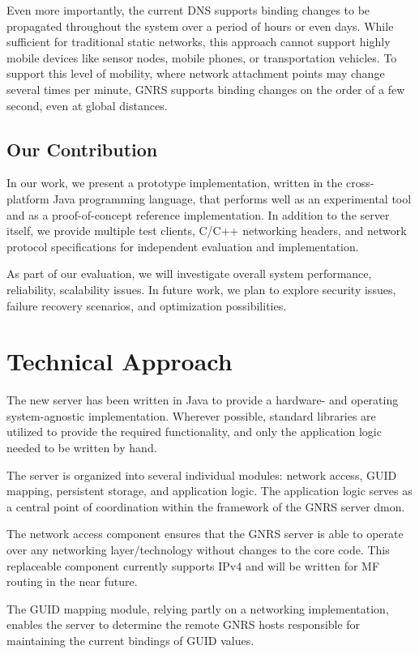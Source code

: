 \documentclass{article}
\begin{document}
Even more importantly, the current DNS supports binding changes to be
propagated throughout the system over a period of hours or even days.  While
sufficient for traditional static networks, this approach cannot support
highly mobile devices like sensor nodes, mobile phones, or transportation
vehicles.  To support this level of mobility, where network attachment points
may change several times per minute, GNRS supports binding changes on the
order of a few second, even at global distances.

\subsection{Our Contribution}
In our work, we present a prototype implementation, written in the
cross-platform Java programming language, that performs well as an
experimental tool and as a proof-of-concept reference implementation.  In
addition to the server itself, we provide multiple test clients, C/C++
networking headers, and network protocol specifications for independent
evaluation and implementation.

As part of our evaluation, we will investigate overall system performance,
reliability, scalability issues.  In future work, we plan to explore security
issues, failure recovery scenarios, and optimization possibilities.

\section{Technical Approach}
The new server has been written in Java to provide a hardware- and operating
system-agnostic implementation.  Wherever possible, standard libraries are
utilized to provide the required functionality, and only the application logic
needed to be written by hand.

The server is organized into several individual modules: network access, GUID
mapping, persistent storage, and application logic.  The application logic
serves as a central point of coordination within the framework of the GNRS
server dmon.

The network access component ensures that the GNRS server is able to operate
over any networking layer/technology without changes to the core code.  This
replaceable component currently supports IPv4 and will be written for MF
routing in the near future.

The GUID mapping module, relying partly on a networking implementation,
enables the server to determine the remote GNRS hosts responsible for
maintaining the current bindings of GUID values.
\end{document}
